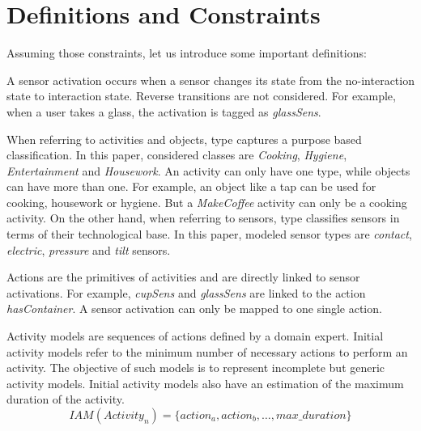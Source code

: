 \section{Definitions and Constraints}
\label{sec:approach:def}

Assuming those constraints, let us introduce some important definitions:

\begin{defn}
 A sensor activation occurs when a sensor changes its state from the no-interaction state to interaction state. Reverse transitions are not considered. For example, when a user takes a glass, the activation is tagged as \textit{glassSens}.
\end{defn}

\begin{defn}[Type]
 When referring to activities and objects, type captures a purpose based classification. In this paper, considered classes are \textit{Cooking}, \textit{Hygiene}, \textit{Entertainment} and \textit{Housework}. An activity can only have one type, while objects can have more than one. For example, an object like a tap can be used for cooking, housework or hygiene. But a \textit{MakeCoffee} activity can only be a cooking activity. On the other hand, when referring to sensors, type classifies sensors in terms of their technological base. In this paper, modeled sensor types are \textit{contact}, \textit{electric}, \textit{pressure} and \textit{tilt} sensors. 
\end{defn}
 
\begin{defn}[Actions]
 Actions are the primitives of activities and are directly linked to sensor activations. For example, \textit{cupSens} and \textit{glassSens} are linked to the action \textit{hasContainer}. A sensor activation can only be mapped to one single action.
\end{defn}

\begin{defn}
Activity models are sequences of actions defined by a domain expert. Initial activity models refer to the minimum number of necessary actions to perform an activity. The objective of such models is to represent incomplete but generic activity models. Initial activity models also have an estimation of the maximum duration of the activity.
\begin{equation}
  IAM(Activity_n) = \{action_a, action_b, \ldots , max\_duration\}
 \end{equation} 
\end{defn}

